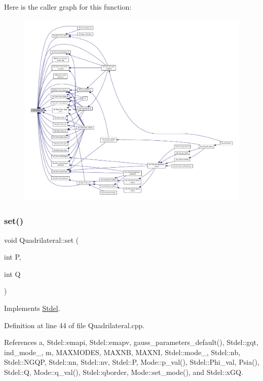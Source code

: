 Here is the caller graph for this function\+:
\nopagebreak
\begin{figure}[H]
\begin{center}
\leavevmode
\includegraphics[width=350pt]{classStdel_a457d20e34fb7a32eb1e4aca6c19f53a2_icgraph}
\end{center}
\end{figure}
\mbox{\label{classQuadrilateral_a369e691d1ae71d00f9474078d176f032}} 
\subsubsection{\texorpdfstring{set()}{set()}}
{\footnotesize\ttfamily void Quadrilateral\+::set (\begin{DoxyParamCaption}\item[{int}]{P,  }\item[{int}]{Q }\end{DoxyParamCaption})\hspace{0.3cm}{\ttfamily [virtual]}}



Implements \hyperlink{classStdel_ab42c46493ab17be6f2642a558fea8a05}{Stdel}.



Definition at line 44 of file Quadrilateral.\+cpp.



References a, Stdel\+::emapi, Stdel\+::emapv, gauss\+\_\+parameters\+\_\+default(), Stdel\+::gqt, ind\+\_\+mode\+\_\+, m, M\+A\+X\+M\+O\+D\+ES, M\+A\+X\+NB, M\+A\+X\+NI, Stdel\+::mode\+\_\+, Stdel\+::nb, Stdel\+::\+N\+G\+QP, Stdel\+::nn, Stdel\+::nv, Stdel\+::P, Mode\+::p\+\_\+val(), Stdel\+::\+Phi\+\_\+val, Psia(), Stdel\+::Q, Mode\+::q\+\_\+val(), Stdel\+::qborder, Mode\+::set\+\_\+mode(), and Stdel\+::x\+GQ.

